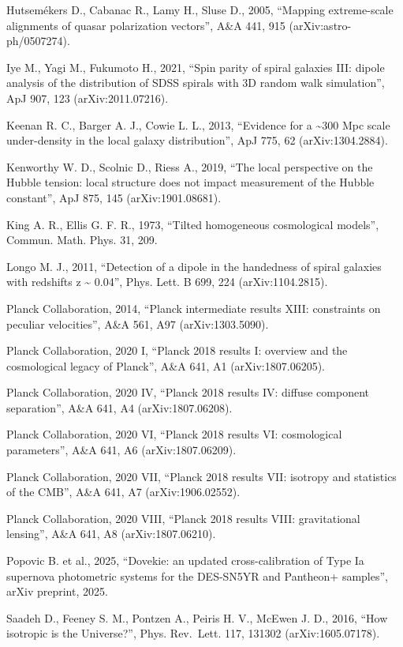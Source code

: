 \documentclass[
]{article}
\begin{document}
Hutsemékers D., Cabanac R., Lamy H., Sluse D., 2005, ``Mapping
extreme-scale alignments of quasar polarization vectors'', A\&A 441, 915
(arXiv:astro-ph/0507274).

Iye M., Yagi M., Fukumoto H., 2021, ``Spin parity of spiral galaxies
III: dipole analysis of the distribution of SDSS spirals with 3D random
walk simulation'', ApJ 907, 123 (arXiv:2011.07216).

Keenan R. C., Barger A. J., Cowie L. L., 2013, ``Evidence for a
\textasciitilde300 Mpc scale under-density in the local galaxy
distribution'', ApJ 775, 62 (arXiv:1304.2884).

Kenworthy W. D., Scolnic D., Riess A., 2019, ``The local perspective on
the Hubble tension: local structure does not impact measurement of the
Hubble constant'', ApJ 875, 145 (arXiv:1901.08681).

King A. R., Ellis G. F. R., 1973, ``Tilted homogeneous cosmological
models'', Commun. Math. Phys. 31, 209.

Longo M. J., 2011, ``Detection of a dipole in the handedness of spiral
galaxies with redshifts z \textasciitilde{} 0.04'', Phys. Lett. B 699,
224 (arXiv:1104.2815).

Planck Collaboration, 2014, ``Planck intermediate results XIII:
constraints on peculiar velocities'', A\&A 561, A97 (arXiv:1303.5090).

Planck Collaboration, 2020 I, ``Planck 2018 results I: overview and the
cosmological legacy of Planck'', A\&A 641, A1 (arXiv:1807.06205).

Planck Collaboration, 2020 IV, ``Planck 2018 results IV: diffuse
component separation'', A\&A 641, A4 (arXiv:1807.06208).

Planck Collaboration, 2020 VI, ``Planck 2018 results VI: cosmological
parameters'', A\&A 641, A6 (arXiv:1807.06209).

Planck Collaboration, 2020 VII, ``Planck 2018 results VII: isotropy and
statistics of the CMB'', A\&A 641, A7 (arXiv:1906.02552).

Planck Collaboration, 2020 VIII, ``Planck 2018 results VIII:
gravitational lensing'', A\&A 641, A8 (arXiv:1807.06210).

Popovic B. et al., 2025, ``Dovekie: an updated cross-calibration of Type
Ia supernova photometric systems for the DES-SN5YR and Pantheon+
samples'', arXiv preprint, 2025.

Saadeh D., Feeney S. M., Pontzen A., Peiris H. V., McEwen J. D., 2016,
``How isotropic is the Universe?'', Phys. Rev.~Lett. 117, 131302
(arXiv:1605.07178).
\end{document}
